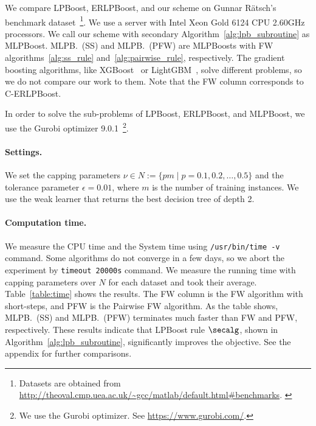 We compare LPBoost, ERLPBoost, and our scheme 
on Gunnar R{\"{a}}tsch's benchmark dataset~\footnote{%
    Datasets are obtained from %
    \url{http://theoval.cmp.uea.ac.uk/~gcc/matlab/default.html\#benchmarks}. %
    \label{fnote:benchmark}%
}.
We use a server with 
Intel Xeon Gold 6124 CPU 2.60GHz processors. 
We call our scheme with secondary Algorithm~\ref{alg:lpb_subroutine} 
as MLPBoost. MLPB.~(SS) and MLPB.~(PFW) are MLPBoosts 
with FW algorithms~\ref{alg:ss_rule} and~\ref{alg:pairwise_rule}, 
respectively. 
The gradient boosting algorithms, 
like XGBoost~\citep{tianqi+:kdd16} or LightGBM~\citep{ke+:nips17}, 
solve different problems, 
so we do not compare our work to them. 
Note that the FW column corresponds to C-ERLPBoost. 

In order to solve the sub-problems of 
LPBoost, ERLPBoost, and MLPBoost, 
we use the Gurobi optimizer 9.0.1~\footnote{%
    We use the Gurobi optimizer. See %
    \url{https://www.gurobi.com/}. %
}. 
\paragraph{Settings.} 
We set the capping parameters 
$\nu \in N := \{pm \mid p = 0.1, 0.2, \dots, 0.5\}$ 
and the tolerance parameter $\epsilon = 0.01$, 
where $m$ is the number of training instances. 
We use the weak learner that 
returns the best decision tree of depth 2. 
\paragraph{Computation time.} 
We measure the CPU time and the System time using 
\texttt{/usr/bin/time -v} command. 
Some algorithms do not converge in a few days, 
so we abort the experiment by \texttt{timeout 20000s} command. 
We measure the running time with capping parameters 
over $N$ for each dataset and took their average. 
Table~\ref{table:time} shows the results.
The FW column is the FW algorithm with short-steps, 
and PFW is the Pairwise FW algorithm. 
As the table shows, MLPB.~(SS) and MLPB.~(PFW) terminates 
much faster than FW and PFW, respectively. 
These results indicate that 
LPBoost rule $\secalg$, shown in Algorithm~\ref{alg:lpb_subroutine}, 
significantly improves the objective. 
See the appendix for further comparisons. 
\begin{table}[h]
    \caption{ %
        Comparison of the computation time (seconds). %
        Each cell is the average computation time over %
        the capping parameters over $N$. %
        Some algorithm does not terminate in a few hours %
        so we abort them within some appropriate time. %
    }
    \label{table:time}
    \centering
    
\end{table}
